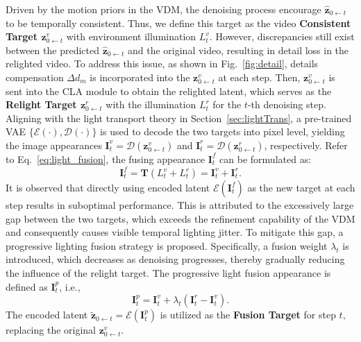 Driven by the motion priors in the VDM, the denoising process encourage 
$\hat{\mathbf{z}}_{0 \gets t}$ to be temporally consistent.
Thus, we define this target as the video \textbf{Consistent Target $\mathbf{z}^{v}_{0 \gets t}$} with environment illumination $L^{v}_t$.
However, discrepancies still exist between the predicted $\hat{\mathbf{z}}_{0 \gets t}$ and the original video,
resulting in detail loss in the relighted video.
To address this issue, as shown in Fig.~\ref{fig:detail},
details compensation $\Delta d_m$ is incorporated into the $\mathbf{z}^{v}_{0 \gets t}$ at each step.
Then, $\mathbf{z}^{v}_{0 \gets t}$ is sent into the CLA module to
obtain the relighted latent, which serves 
as the \textbf{Relight Target $\mathbf{z}^{r}_{0 \gets t}$} with the illumination $L^{r}_t$ for the $t$-th denoising step.
Aligning with the light transport theory in Section~\ref{sec:lightTrans},
a pre-trained VAE $\{ {\mathcal{E}(\cdot)}, {\mathcal{D}(\cdot)} \}$ is used to
decode the two targets into pixel level,
yielding the image appearances 
$\mathbf{I}^{v}_{t} = \mathcal{D}(\mathbf{z}^{v}_{0 \gets t})$ 
and $ \mathbf{I}^{r}_{t} = \mathcal{D}(\mathbf{z}^{r}_{0 \gets t})$, respectively.
Refer to Eq.~\ref{eq:light_fusion},
the fusing appearance $\mathbf{I}^{f}_{t}$ can be formulated as:
\begin{equation} \label{eq:target_fusion}
   \mathbf{I}^{f}_{t} =  \mathbf{T}(L^{v}_t +L^{r}_t) = \mathbf{I}^{v}_{t} + \mathbf{I}^{r}_{t}.
\end{equation}
It is observed that directly using encoded latent $\mathcal{E}(\mathbf{I}^{f}_{t})$
as the new target at each step results in suboptimal performance.
This is attributed to the excessively large gap between the two targets, 
which exceeds the refinement capability of the VDM and 
consequently causes visible temporal lighting jitter.
To mitigate this gap, a progressive lighting fusion strategy is proposed.
Specifically, a fusion weight $\lambda_t$ is introduced, which 
decreases as denoising progresses, thereby 
gradually reducing the influence of the relight target.
The progressive light fusion appearance is defined as $\mathbf{I}^{p}_{t}$, i.e.,
\begin{equation} \label{eq:pro_target_fusion}
   \mathbf{I}^{p}_{t} = \mathbf{I}^{v}_{t} + \lambda_t (\mathbf{I}^{r}_{t}-\mathbf{I}^{v}_{t}).
\end{equation}
The encoded latent $ \tilde{\mathbf{z}}_{0 \gets t} = \mathcal{E}(\mathbf{I}^{p}_{t})$ is utilized as the \textbf{Fusion Target} for step $t$,
replacing the original $\mathbf{z}^{v}_{0 \gets t}$.
